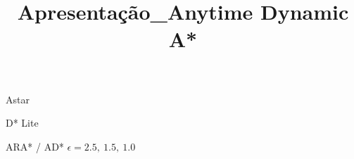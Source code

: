 \documentclass[10pt]{beamer}
\title{Apresentação_Anytime Dynamic A*}
\begin{document}
\maketitle

\begin{frame}{Astar}

\end{frame}


\begin{frame}{D* Lite}

\end{frame}


\begin{frame}{ARA* / AD* \hfill $\epsilon= 2.5,\: 1.5, \:1.0$}

\end{frame}
\end{document}
